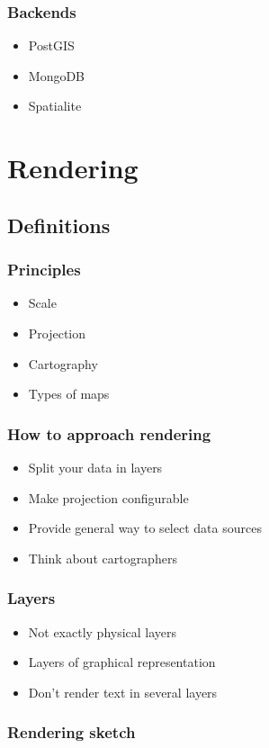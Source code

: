 \documentclass[14pt]{beamer}
\begin{document}
\begin{frame}
  \frametitle{Backends}
  \begin{itemize}
  \item PostGIS
  \item MongoDB
  \item Spatialite
  \end{itemize}
\end{frame}


\section{Rendering}

\subsection{Definitions}
\label{sec:definitions-1}

\begin{frame}
  \frametitle{Principles}
  \begin{itemize}
  \item Scale
  \item Projection
  \item Cartography
  \item Types of maps
  \end{itemize}
\end{frame}

\begin{frame}
  \frametitle{How to approach rendering}
  \begin{itemize}
  \item Split your data in layers
  \item Make projection configurable
  \item Provide general way to select data sources
  \item Think about cartographers
  \end{itemize}
\end{frame}

\begin{frame}
  \frametitle{Layers}
  \begin{itemize}
  \item Not exactly physical layers
  \item Layers of graphical representation
  \item Don't render text in several layers
  \end{itemize}
\end{frame}

\begin{frame}
  \frametitle{Rendering sketch}
\end{frame}
\end{document}
